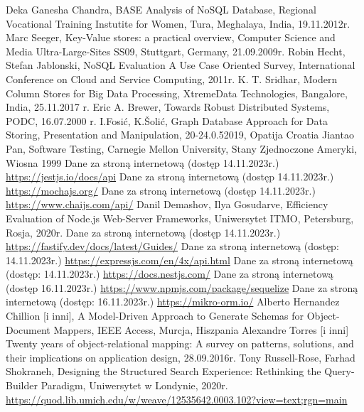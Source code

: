 \documentclass[12pt, a4paper, twoside, openany]{book}
\begin{document}
\begin{thebibliography}{9}
     Deka Ganesha Chandra, BASE Analysis of NoSQL Database, Regional Vocational Training Instutite for Women, Tura, Meghalaya, India, 19.11.2012r.
     Marc Seeger, Key-Value stores: a practical overview, Computer Science and Media Ultra-Large-Sites SS09, Stuttgart, Germany, 21.09.2009r.
     Robin Hecht, Stefan Jablonski, NoSQL Evaluation A Use Case Oriented Survey, International Conference on Cloud and Service Computing, 2011r.
     K. T. Sridhar, Modern Column Stores for Big Data Processing, XtremeData Technologies, Bangalore, India, 25.11.2017 r.
     Eric A. Brewer, Towards Robust Distributed Systems, PODC, 16.07.2000 r.
    I.Fosić, K.Šolić, Graph Database Approach for Data Storing, Presentation and Manipulation, 20-24.0.52019, Opatija Croatia
     Jiantao Pan, Software Testing, Carnegie Mellon University, Stany Zjednoczone Ameryki, Wiosna 1999
     Dane za stroną internetową (dostęp 14.11.2023r.) \url{https://jestjs.io/docs/api}
     Dane za stroną internetową (dostęp 14.11.2023r.) \url{https://mochajs.org/}
     Dane za stroną internetową (dostęp 14.11.2023r.) \url{https://www.chaijs.com/api/}
     Danil Demashov, Ilya Gosudarve, Efficiency Evaluation of Node.js Web-Server Frameworks, Uniwersytet ITMO, Petersburg, Rosja, 2020r.
     Dane za stroną internetową (dostęp 14.11.2023r.) \url{https://fastify.dev/docs/latest/Guides/}
     Dane za stroną internetową (dostęp: 14.11.2023r.) \url{https://expressjs.com/en/4x/api.html}
     Dane za stroną internetową (dostęp: 14.11.2023r.) \url{https://docs.nestjs.com/}
     Dane za stroną internetową (dostęp 16.11.2023r.) \url{https://www.npmjs.com/package/sequelize}
     Dane za stroną internetową (dostęp: 16.11.2023r.) \url{https://mikro-orm.io/}
     Alberto Hernandez Chillion [i inni], A Model-Driven Approach to Generate Schemas for Object-Document Mappers, IEEE Access, Murcja, Hiszpania
     Alexandre Torres [i inni] Twenty years of object-relational mapping: A survey on patterns, solutions, and their implications on application design, 28.09.2016r.
    Tony Russell-Rose, Farhad Shokraneh, Designing the Structured Search Experience: Rethinking the Query-Builder Paradigm, Uniwersytet w Londynie, 2020r. \url{https://quod.lib.umich.edu/w/weave/12535642.0003.102?view=text;rgn=main}
    \end{thebibliography}
\end{document}
